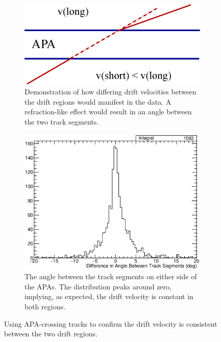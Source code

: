 \begin{figure}
  \centering
  \begin{subfigure}[t]{0.48\linewidth}
    \centering
    \includegraphics[width=\textwidth]{DriftVelocityDiffGeo.eps}
    \caption{Demonstration of how differing drift velocities between the drift regions would manifest in the data.  A refraction-like effect would result in an angle between the two track segments.}
    \label{fig:DriftVelocityDiffGeo}
  \end{subfigure}
  \hfill
  \begin{subfigure}[t]{0.48\linewidth}
    \centering
    \includegraphics[width=\textwidth]{DriftVelocityDiffRes.eps}
    \caption{The angle between the track segments on either side of the APAs.  The distribution peaks around zero, implying, as expected, the drift velocity is constant in both regions.}
    \label{fig:DriftVelocityDiffRes}
  \end{subfigure}
  \caption[Using APA-crossing tracks to confirm the drift velocity is consistent between the two drift regions.]{Using APA-crossing tracks to confirm the drift velocity is consistent between the two drift regions.}
  \label{fig:DriftVelocityDiff}
\end{figure}

